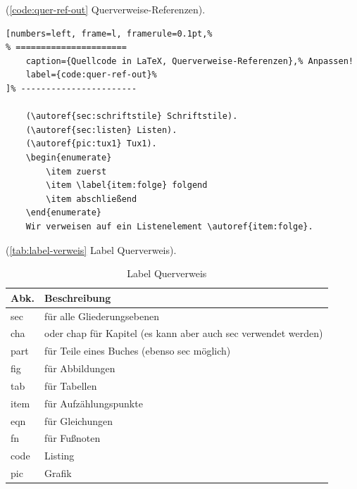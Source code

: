 (\autoref{code:quer-ref-out} Querverweise-Referenzen).%
\lstset{language=[LaTeX]TeX} %
\begin{lstlisting}[numbers=left, frame=l, framerule=0.1pt,%
% ======================
	caption={Quellcode in LaTeX, Querverweise-Referenzen},% Anpassen!
	label={code:quer-ref-out}%
]% -----------------------

	(\autoref{sec:schriftstile} Schriftstile).
	(\autoref{sec:listen} Listen).
	(\autoref{pic:tux1} Tux1).
	\begin{enumerate}
		\item zuerst
		\item \label{item:folge} folgend
		\item abschließend
	\end{enumerate}
	Wir verweisen auf ein Listenelement \autoref{item:folge}.
\end{lstlisting}

(\autoref{tab:label-verweis} Label Querverweis).
\begin{table}[!hb] %
	\centering
	\begin{tabular} {ll}
		\toprule %
			Abk. & Beschreibung \\
		\midrule
			sec  & für alle Gliederungsebenen \\
			cha  & oder chap für Kapitel (es kann aber auch sec verwendet werden) \\
			part & für Teile eines Buches (ebenso sec möglich) \\
			fig  & für Abbildungen \\
			tab  & für Tabellen \\
			item & für Aufzählungspunkte \\
			eqn  & für Gleichungen  \\
			fn   & für Fußnoten \\
			code & Listing \\
			pic  & Grafik \\
		\bottomrule
	\end{tabular}
		\caption{Label Querverweis }	  %
		\label{tab:label-verweis}	      %
\end{table}

